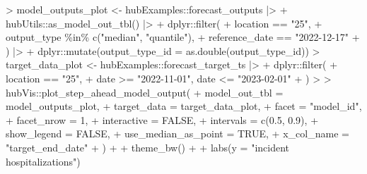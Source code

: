 \documentclass[
  letterpaper,
  DIV=11,
  numbers=noendperiod]{scrartcl}
\newenvironment{Shaded}{\begin{snugshade}}{\end{snugshade}}
\newcommand{\AttributeTok}[1]{\textcolor[rgb]{0.40,0.45,0.13}{#1}}
\newcommand{\ConstantTok}[1]{\textcolor[rgb]{0.56,0.35,0.01}{#1}}
\newcommand{\DecValTok}[1]{\textcolor[rgb]{0.68,0.00,0.00}{#1}}
\newcommand{\ErrorTok}[1]{\textcolor[rgb]{0.68,0.00,0.00}{#1}}
\newcommand{\FloatTok}[1]{\textcolor[rgb]{0.68,0.00,0.00}{#1}}
\newcommand{\FunctionTok}[1]{\textcolor[rgb]{0.28,0.35,0.67}{#1}}
\newcommand{\NormalTok}[1]{\textcolor[rgb]{0.00,0.23,0.31}{#1}}
\newcommand{\OtherTok}[1]{\textcolor[rgb]{0.00,0.23,0.31}{#1}}
\newcommand{\SpecialCharTok}[1]{\textcolor[rgb]{0.37,0.37,0.37}{#1}}
\newcommand{\StringTok}[1]{\textcolor[rgb]{0.13,0.47,0.30}{#1}}
\begin{document}
\begin{Shaded}
\begin{Highlighting}[]
\SpecialCharTok{\textgreater{}}\NormalTok{ model\_outputs\_plot }\OtherTok{\textless{}{-}}\NormalTok{ hubExamples}\SpecialCharTok{::}\NormalTok{forecast\_outputs }\SpecialCharTok{|\textgreater{}}
\SpecialCharTok{+}\NormalTok{   hubUtils}\SpecialCharTok{::}\FunctionTok{as\_model\_out\_tbl}\NormalTok{() }\SpecialCharTok{|\textgreater{}}
\SpecialCharTok{+}\NormalTok{   dplyr}\SpecialCharTok{::}\FunctionTok{filter}\NormalTok{(}
\SpecialCharTok{+}\NormalTok{     location }\SpecialCharTok{==} \StringTok{"25"}\NormalTok{,}
\SpecialCharTok{+}\NormalTok{     output\_type }\SpecialCharTok{\%in\%} \FunctionTok{c}\NormalTok{(}\StringTok{"median"}\NormalTok{, }\StringTok{"quantile"}\NormalTok{),}
\SpecialCharTok{+}\NormalTok{     reference\_date }\SpecialCharTok{==} \StringTok{"2022{-}12{-}17"}
\SpecialCharTok{+}\NormalTok{   ) }\SpecialCharTok{|\textgreater{}}
\SpecialCharTok{+}\NormalTok{   dplyr}\SpecialCharTok{::}\FunctionTok{mutate}\NormalTok{(}\AttributeTok{output\_type\_id =} \FunctionTok{as.double}\NormalTok{(output\_type\_id))}
\SpecialCharTok{\textgreater{}}\NormalTok{ target\_data\_plot }\OtherTok{\textless{}{-}}\NormalTok{ hubExamples}\SpecialCharTok{::}\NormalTok{forecast\_target\_ts }\SpecialCharTok{|\textgreater{}}
\SpecialCharTok{+}\NormalTok{   dplyr}\SpecialCharTok{::}\FunctionTok{filter}\NormalTok{(}
\SpecialCharTok{+}\NormalTok{     location }\SpecialCharTok{==} \StringTok{"25"}\NormalTok{,}
\SpecialCharTok{+}\NormalTok{     date }\SpecialCharTok{\textgreater{}=} \StringTok{"2022{-}11{-}01"}\NormalTok{, date }\SpecialCharTok{\textless{}=} \StringTok{"2023{-}02{-}01"}
\SpecialCharTok{+}\NormalTok{   )}
\SpecialCharTok{\textgreater{}} 
\ErrorTok{\textgreater{}}\NormalTok{ hubVis}\SpecialCharTok{::}\FunctionTok{plot\_step\_ahead\_model\_output}\NormalTok{(}
\SpecialCharTok{+}   \AttributeTok{model\_out\_tbl =}\NormalTok{ model\_outputs\_plot,}
\SpecialCharTok{+}   \AttributeTok{target\_data =}\NormalTok{ target\_data\_plot,}
\SpecialCharTok{+}   \AttributeTok{facet =} \StringTok{"model\_id"}\NormalTok{,}
\SpecialCharTok{+}   \AttributeTok{facet\_nrow =} \DecValTok{1}\NormalTok{,}
\SpecialCharTok{+}   \AttributeTok{interactive =} \ConstantTok{FALSE}\NormalTok{,}
\SpecialCharTok{+}   \AttributeTok{intervals =} \FunctionTok{c}\NormalTok{(}\FloatTok{0.5}\NormalTok{, }\FloatTok{0.9}\NormalTok{),}
\SpecialCharTok{+}   \AttributeTok{show\_legend =} \ConstantTok{FALSE}\NormalTok{,}
\SpecialCharTok{+}   \AttributeTok{use\_median\_as\_point =} \ConstantTok{TRUE}\NormalTok{,}
\SpecialCharTok{+}   \AttributeTok{x\_col\_name =} \StringTok{"target\_end\_date"}
\SpecialCharTok{+}\NormalTok{ ) }\SpecialCharTok{+}
\SpecialCharTok{+}   \FunctionTok{theme\_bw}\NormalTok{() }\SpecialCharTok{+}
\SpecialCharTok{+}   \FunctionTok{labs}\NormalTok{(}\AttributeTok{y =} \StringTok{"incident hospitalizations"}\NormalTok{)}
\end{Highlighting}
\end{Shaded}
\end{document}
